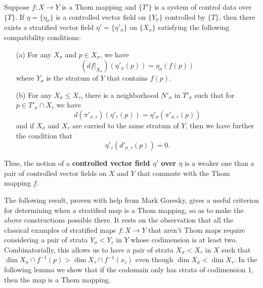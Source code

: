 \begin{defn}
Suppose $f:X\to Y$ is a Thom mapping and $\{T'\}$ is a system of control data over $\{T\}$. If $\eta=\{\eta_{\sigma}\}$ is a controlled vector field on $\{Y_{\sigma}\}$ controlled by $\{T\}$, then there exists a stratified vector field $\eta'=\{\eta'_{\sigma}\}$ on $\{X_{\sigma}\}$ satisfying the following compatibility conditions:
\begin{enumerate}
\item[(a)] For any $X_{\sigma}$ and $p\in X_{\sigma}$, we have
\[
(df|_{X_{\sigma}})(\eta'_{\sigma}(p)) = \eta_{\sigma}(f(p))
\]
where $Y_{\sigma}$ is the stratum of $Y$ that contains $f(p)$.
\item[(b)] For any $X_{\sigma}\leq X_{\tau}$, there is a neighborhood $N'_{\sigma}$ in $T'_{\sigma}$ such that for $p\in T'_{\sigma}\cap X_{\tau}$ we have
\[
d(\pi'_{\sigma,\tau})(\eta'_{\tau}(p)) = \eta'_{\sigma}(\pi'_{\sigma,\tau}(p))
\]
and if $X_{\sigma}$ and $X_{\tau}$ are carried to the same stratum of $Y$, then we have further the condition that
\[
\eta'_{\tau}(d'_{\sigma,\tau}(p)) = 0.
\]
\end{enumerate}
Thus, the notion of a \textbf{controlled vector field $\eta'$ over $\eta$} is a weaker one than a pair of controlled vector fields on $X$ and $Y$ that commute with the Thom mapping $f$.
\end{defn}

The following result, proven with help from Mark Goresky, gives a useful criterion for determining when a stratified map is a Thom mapping, so as to make the above constructions possible there. It rests on the observation that all the classical examples of stratified maps $f:X\to Y$ that aren't Thom maps require considering a pair of strata $Y_{\sigma}<Y_{\tau}$ in $Y$ whose codimension is at least two. Combinatorially, this allows us to have a pair of strata $X_{\sigma}<X_{\tau}$ in $X$ such that $\dim X_{\sigma}\cap f^{-1}(p) > \dim X_{\tau}\cap f^{-1}(x_i)$ even though $\dim X_{\sigma}<\dim X_{\tau}$. In the following lemma we show that if the codomain only has strata of codimension 1, then the map is a Thom mapping.

